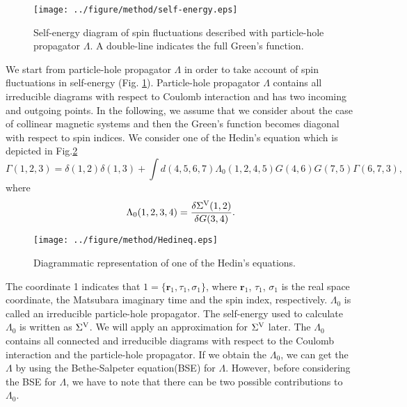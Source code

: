 \begin{figure} %
	\centering
	\texttt{[image: ../figure/method/self-energy.eps]}
	\caption{Self-energy diagram of spin fluctuations described with particle-hole propagator $\Lambda$. A double-line indicates the full Green's function.}
	\label{fig:SF-self}
\end{figure}
We start from particle-hole propagator $\Lambda$ in order to 
take account of spin fluctuations in self-energy (Fig. \ref{fig:SF-self}).
Particle-hole propagator $\Lambda$ contains all irreducible 
diagrams with respect to Coulomb interaction and has two 
incoming and outgoing points. 
In the following, we assume that we consider about the case of collinear magnetic systems and 
then the Green's function becomes diagonal with respect to spin indices.
We consider one of the Hedin's equation\cite{Sole1994} which is depicted
in Fig.\ref{fig:Hedineq}
%
\begin{equation}
	\Gamma(1,2,3) = \delta(1,2)\delta(1,3) + 
	\int d(4,5,6,7)\Lambda_0(1,2,4,5)
	G(4,6)G(7,5)\Gamma(6,7,3),
	\label{eq:Hedineq}
\end{equation}
%
where 
%
\begin{equation}
	\Lambda_0(1,2,3,4) = \frac{\delta\Sigma^{\rm V}(1,2)}{\delta G(3,4)}.
	\label{eq:lambda0}
\end{equation}
%
\begin{figure} %
	\centering
	\texttt{[image: ../figure/method/Hedineq.eps]}
	\caption{Diagrammatic representation of one of the Hedin's equations.}
	\label{fig:Hedineq}
\end{figure}
The coordinate 1 indicates that $1=\{\bm r_1, \tau_1, \sigma_1\}$, 
where $\bm r_1$, $\tau_1$, $\sigma_1$ is the real space coordinate,
the Matsubara imaginary time and the spin index, respectively.
$\Lambda_0$ is called an irreducible particle-hole propagator\cite{Arya2008}.
The self-energy used to calculate $\Lambda_0$ is written as $\Sigma^{\rm V}$.
We will apply an approximation for $\Sigma^{\rm V}$ later.
The $\Lambda_0$ contains all connected and irreducible diagrams with
respect to the Coulomb interaction and the particle-hole propagator.
If we obtain the $\Lambda_0$, we can get the $\Lambda$ by using the
Bethe-Salpeter equation(BSE)\cite{BSE1951} for $\Lambda$.
However, before considering the BSE for $\Lambda$, we have to note that
there can be two possible contributions to $\Lambda_0$.

